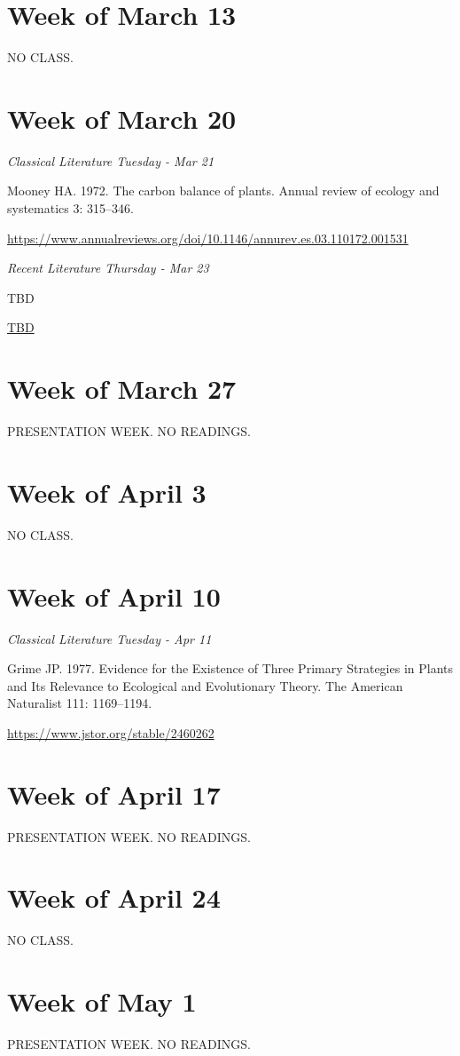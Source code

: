 \documentclass[12pt, notitlepage]{article}   	%
\begin{document}
{\section*{Week of March 13}
NO CLASS.

\section*{Week of March 20}
\textit{Classical Literature Tuesday - Mar 21} \par
Mooney HA. 1972. The carbon balance of plants. 
Annual review of ecology and systematics 3: 315–346. \par
\url{https://www.annualreviews.org/doi/10.1146/annurev.es.03.110172.001531}

\textit{Recent Literature Thursday - Mar 23} \par
TBD \par
\url{TBD}

\section*{Week of March 27}
PRESENTATION WEEK. NO READINGS.

\section*{Week of April 3}
NO CLASS.

\section*{Week of April 10}
\textit{Classical Literature Tuesday - Apr 11} \par
Grime JP. 1977. Evidence for the Existence of Three Primary Strategies in Plants and Its 
Relevance to Ecological and Evolutionary Theory. 
The American Naturalist 111: 1169–1194. \par
\url{https://www.jstor.org/stable/2460262}

\section*{Week of April 17}
PRESENTATION WEEK. NO READINGS.

\section*{Week of April 24}
NO CLASS.

\section*{Week of May 1}
PRESENTATION WEEK. NO READINGS.

} %
\end{document}
